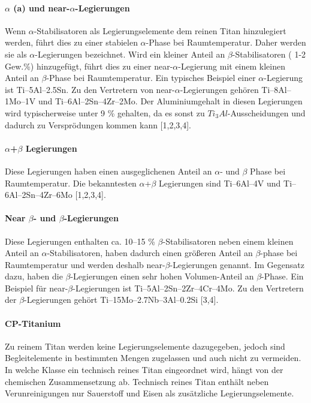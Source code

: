 \paragraph{$\alpha$ (a) und near-$\alpha$-Legierungen}
Wenn $\alpha$-Stabilisatoren als Legierungselemente dem reinen Titan hinzulegiert werden, führt dies zu einer stabielen $\alpha$-Phase bei Raumtemperatur. Daher werden sie als $\alpha$-Legierungen bezeichnet. Wird ein kleiner Anteil an $\beta$-Stabilisatoren ( 1-2 Gew.\%) hinzugefügt, führt dies zu einer near-$\alpha$-Legierung mit einem kleinen Anteil an $\beta$-Phase bei Raumtemperatur. Ein typisches Beispiel einer $\alpha$-Legierung ist Ti–5Al–2.5Sn. Zu den Vertretern von near-$\alpha$-Legierungen gehören Ti–8Al–1Mo–1V und Ti–6Al–2Sn–4Zr–2Mo. Der Aluminiumgehalt in diesen Legierungen wird typischerweise unter 9 \% gehalten, da es sonst zu $Ti_{3}Al$-Ausscheidungen und dadurch zu Versprödungen kommen kann [1,2,3,4].

\paragraph{$\alpha$+$\beta$ Legierungen}
Diese Legierungen haben einen ausgeglichenen Anteil an $\alpha$- und $\beta$ Phase bei Raumtemperatur. Die bekanntesten $\alpha$+$\beta$ Legierungen sind Ti–6Al–4V und Ti–6Al–2Sn–4Zr–6Mo [1,2,3,4].

\paragraph{Near $\beta$- und $\beta$-Legierungen}
Diese Legierungen enthalten ca. 10--15 \% $\beta$-Stabilisatoren neben einem kleinen Anteil an $\alpha$-Stabilisatoren, haben dadurch einen größeren Anteil an $\beta$-phase bei Raumtemperatur und werden deshalb near-$\beta$-Legierungen genannt. Im Gegensatz dazu, haben die $\beta$-Legierungen einen sehr hohen Volumen-Anteil an $\beta$-Phase. Ein Beispiel für near-$\beta$-Legierungen ist Ti–5Al–2Sn–2Zr–4Cr–4Mo. Zu den Vertretern der $\beta$-Legierungen gehört Ti–15Mo–2.7Nb–3Al–0.2Si [3,4].

\paragraph{CP-Titanium} 
Zu reinem Titan werden keine Legierungselemente dazugegeben, jedoch sind Begleitelemente in bestimmten Mengen zugelassen und auch nicht zu vermeiden. In welche Klasse ein technisch reines Titan eingeordnet wird, hängt von der chemischen Zusammensetzung ab. Technisch reines Titan enthält neben Verunreinigungen nur Sauerstoff und Eisen als zusätzliche Legierungselemente.




